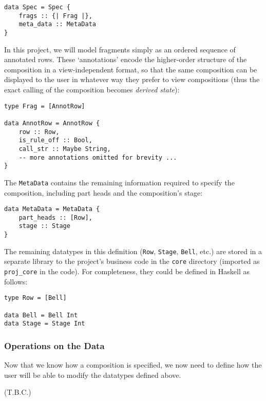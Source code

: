 \documentclass[12pt]{article}
\begin{document}
\begin{verbatim}
data Spec = Spec {
    frags :: {| Frag |},
    meta_data :: MetaData
}
\end{verbatim}

In this project, we will model fragments simply as an ordered sequence of annotated rows.  These
`annotations' encode the higher-order structure of the composition in a view-independent format,
so that the same composition can be displayed to the user in whatever way they prefer to view
compositions (thus the exact calling of the composition becomes \emph{derived state}):

\begin{verbatim}
type Frag = [AnnotRow]

data AnnotRow = AnnotRow {
    row :: Row,
    is_rule_off :: Bool,
    call_str :: Maybe String,
    -- more annotations omitted for brevity ...
}
\end{verbatim}

The \verb|MetaData| contains the remaining information required to specify the composition,
including part heads and the composition's stage:

\begin{verbatim}
data MetaData = MetaData {
    part_heads :: [Row],
    stage :: Stage
}
\end{verbatim}

The remaining datatypes in this definition (\verb|Row|, \verb|Stage|, \verb|Bell|, etc.) are stored
in a separate library to the project's business code in the \verb|core| directory (imported as
\verb|proj_core| in the code).  For completeness, they could be defined in Haskell as follows:

\begin{verbatim}
type Row = [Bell]

data Bell = Bell Int
data Stage = Stage Int
\end{verbatim}

\subsubsection{Operations on the Data}

Now that we know how a composition is specified, we now need to define how the user will be able to
modify the datatypes defined above.

(T.B.C.)
\end{document}
